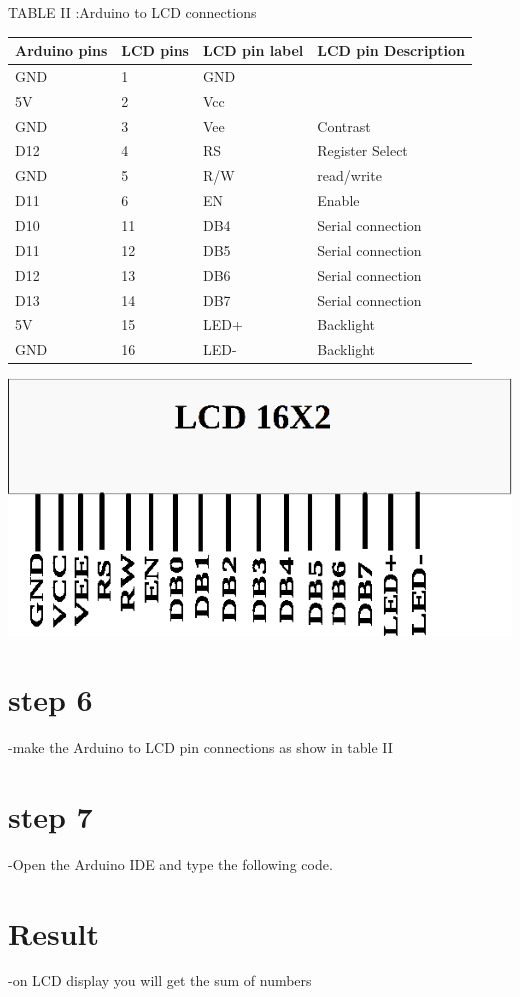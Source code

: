 \documentclass[twocolumn,13pt]{article}
\begin{document}
\begin{center}
    TABLE II :Arduino to LCD connections
\end{center}
 \begin{tabular}{ |p{1.5cm}|p{1.5cm}|p{1.5cm}|p{1.5cm}| }
 \hline
 \setlength{\tabcolsep}{3pt}
Arduino pins & LCD pins & LCD pin label & LCD pin Description\\
\hline
 GND & 1& GND & \\
 \hline
 5V & 2 & Vcc &\\
 \hline
 GND & 3 & Vee & Contrast\\
 \hline
 D12 & 4 & RS & Register Select\\
 \hline
 GND & 5 & R/W & read/write\\
 \hline
 D11 & 6 & EN &Enable\\
 \hline
 D10 & 11 & DB4 & Serial connection\\
 \hline
 D11 & 12 & DB5 & Serial connection\\
 \hline
 D12 & 13 & DB6 & Serial connection\\
 \hline
 D13 & 14 & DB7 & Serial connection\\
 \hline
 5V & 15 & LED+ & Backlight\\
 \hline
 GND & 16 & LED- & Backlight\\
 \hline
\end{tabular}



\includegraphics[scale=0.3]{../avr_gcc_assignment/figs/lcd.png} 




\section*{step 6}
-make the Arduino to LCD pin connections as show in  table II
\section*{step 7}
-Open the Arduino IDE and type the following code.

\section*{Result}
-on LCD display you will get the sum of numbers 
\end{document}
